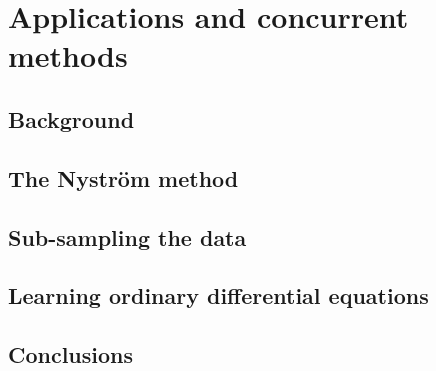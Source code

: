 
\chapter{Applications and concurrent methods} %
\label{ch:applications and concurrent methods}

\section{Background}
\label{sec:ch05_background}

\section{The Nystr\"om method}
\label{sec:the_nystrom_method}

\section{Sub-sampling the data}
\label{sec:sub_sampling_the_data}

\section{Learning ordinary differential equations}
\label{sec:learning_ordinary_differential_equations}

\section{Conclusions}
\label{Conslusions}
